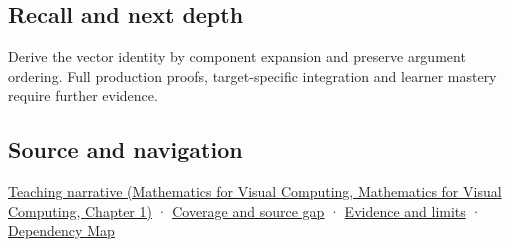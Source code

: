 \subsection{Recall and next depth}\label{appendix-5caa058bd9c7-recall-and-next-depth}

Derive the vector identity by component expansion and preserve argument ordering. Full production proofs, target-specific integration and learner mastery require further evidence.

\subsection{Source and navigation}\label{appendix-5caa058bd9c7-source-and-navigation}

\href{../02-Mathematics-for-Visual-Computing/main.pdf\#nameddest=01-foundations-i-ch017-signed-volume-extends-the-same-idea-into-space}{Teaching narrative (Mathematics for Visual Computing, Mathematics for Visual Computing, Chapter 1)} · \hyperref[appendix-fd090d982a15-phase-6---parts-501-600]{Coverage and source gap} · \hyperref[appendix-a103e7846d21-phase-6---source-analysis-and-verification]{Evidence and limits} · \hyperref[appendix-4ad47bdd269a]{Dependency Map}
